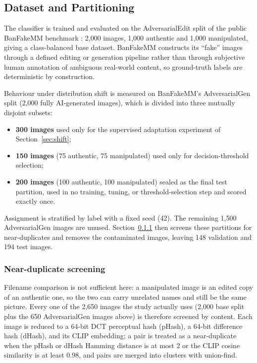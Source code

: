 \documentclass[conference,a4paper]{IEEEtran}
\begin{document}
\subsection{Dataset and Partitioning}
\label{sec:data}

The classifier is trained and evaluated on the AdversarialEdit split of the
public BanFakeMM benchmark \cite{banfakemm}: 2{,}000 images, 1{,}000 authentic
and 1{,}000 manipulated, giving a class-balanced base dataset. BanFakeMM
constructs its ``fake'' images through a defined editing or generation
pipeline rather than through subjective human annotation of ambiguous
real-world content, so ground-truth labels are deterministic by construction.

Behaviour under distribution shift is measured on BanFakeMM's AdversarialGen
split (2{,}000 fully AI-generated images), which is divided into three
mutually disjoint subsets:

\begin{itemize}
\item \textbf{300 images} used only for the supervised adaptation experiment
of Section~\ref{sec:shift};
\item \textbf{150 images} (75 authentic, 75 manipulated) used only for
decision-threshold selection;
\item \textbf{200 images} (100 authentic, 100 manipulated) sealed as the final
test partition, used in no training, tuning, or threshold-selection step and
scored exactly once.
\end{itemize}

Assignment is stratified by label with a fixed seed (42). The remaining
1{,}500 AdversarialGen images are unused. Section~\ref{sec:dedup} then screens
these partitions for near-duplicates and removes the contaminated images,
leaving 148 validation and 194 test images.

\subsubsection{Near-duplicate screening}
\label{sec:dedup}
Filename comparison is not sufficient here: a manipulated image is an edited
copy of an authentic one, so the two can carry unrelated names and still be
the same picture. Every one of the 2{,}650 images the study actually uses
(2{,}000 base split plus the 650 AdversarialGen images above) is therefore
screened by content. Each image is reduced to a 64-bit DCT perceptual hash
(pHash), a 64-bit difference hash (dHash), and its CLIP embedding; a pair is
treated as a near-duplicate when the pHash or dHash Hamming distance is at
most 2 or the CLIP cosine similarity is at least 0.98, and pairs are merged
into clusters with union-find.
\end{document}
